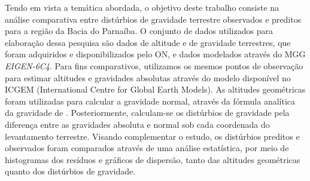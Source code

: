 Tendo em vista a temática abordada, o objetivo deste trabalho consiste na análise comparativa entre distúrbios de gravidade terrestre observados e preditos para a região da Bacia do Parnaíba. O conjunto de dados utilizados para elaboração dessa pesquisa são dados de altitude e de gravidade terrestres, que foram adquiridos e disponibilizados pelo ON, e dados modelados através do MGG \textit{EIGEN-6C4}. Para fins comparativos, utilizamos os mesmos pontos de observação para estimar altitudes e gravidades absolutas através do modelo disponível no ICGEM (International Centre for Global Earth Models). As altitudes geométricas foram utilizadas para calcular a gravidade normal, através da fórmula analítica da gravidade de . Posteriormente, calculam-se os distúrbios de gravidade pela diferença entre as gravidades absoluta e normal sob cada coordenada do levantamento terrestre. Visando complementar o estudo, os distúrbios preditos e observados foram comparados através de uma análise estatística, por meio de histogramas dos resíduos e gráficos de dispersão, tanto das altitudes geométricas quanto dos distúrbios de gravidade. 
